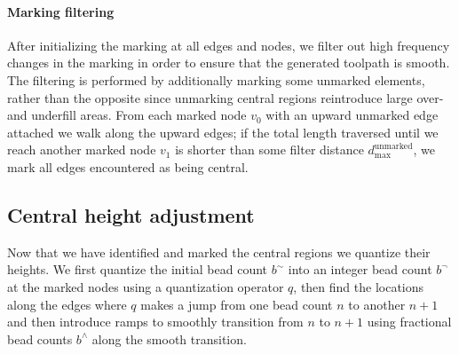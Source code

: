 \paragraph{Marking filtering}
After initializing the marking at all edges and nodes, we filter out high frequency changes in the marking in order to ensure that the generated toolpath is smooth. 
The filtering is performed by additionally marking some unmarked elements, rather than the opposite since unmarking central regions reintroduce large over- and underfill areas.
From each marked node $v_0$ with an upward unmarked edge attached we walk along the upward edges;
if the total length traversed until we reach another marked node $v_1$ is shorter than some filter distance $d_\text{max}^\text{unmarked}$, we mark all edges encountered as being central.















\subsection{Central height adjustment}\label{sec_central_height_adjustment}
Now that we have identified and marked the central regions we quantize their heights.
We first quantize the initial bead count $b^\sim$ into an integer bead count $b^\neg$ at the marked nodes using a quantization operator $q$,
then find the locations along the edges where $q$ makes a jump from one bead count $n$ to another $n+1$
and then introduce ramps to smoothly transition from $n$ to $n+1$ using fractional bead counts $b^\wedge$ along the smooth transition.



